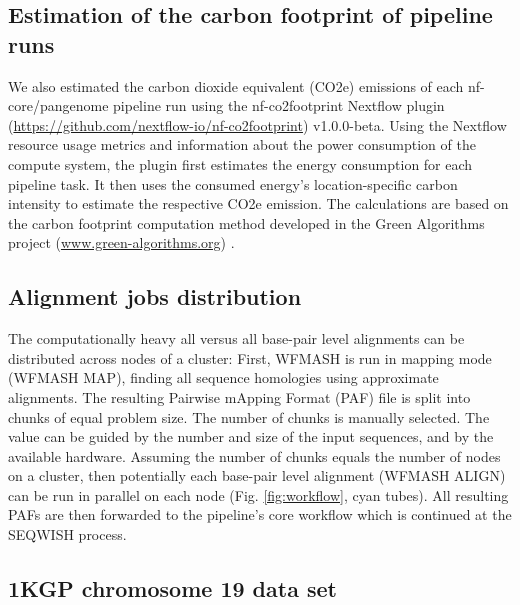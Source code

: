 \documentclass{bioinfo}
\theoremstyle{definition}
\begin{document}
	\subsection{Estimation of the carbon footprint of pipeline runs}
	
	We also estimated the carbon dioxide equivalent (CO2e) emissions of each nf-core/pangenome pipeline run using the nf-co2footprint Nextflow plugin (\href{https://github.com/nextflow-io/nf-co2footprint}{https://github.com/nextflow-io/nf-co2footprint}) v1.0.0-beta. 
	Using the Nextflow resource usage metrics and information about the power consumption of the compute system, the plugin first estimates the energy consumption for each pipeline task. 
	It then uses the consumed energy's location-specific carbon intensity to estimate the respective CO2e emission.
	The calculations are based on the carbon footprint computation method developed in the Green Algorithms project (\href{www.green-algorithms.org}{www.green-algorithms.org}) \citep{Lannelongue2021}.
	
	\subsection{Alignment jobs distribution}
	\label{aln_jobs_dist}

	The computationally heavy all versus all base-pair level alignments can be distributed across nodes of a cluster: 
	First, WFMASH is run in mapping mode (WFMASH MAP), finding all sequence homologies using approximate alignments. 
	The resulting Pairwise mApping Format (PAF) file is split into chunks of equal problem size. 
	The number of chunks is manually selected. 
	The value can be guided by the number and size of the input sequences, and by the available hardware. 
	Assuming the number of chunks equals the number of nodes on a cluster, then potentially each base-pair level alignment (WFMASH ALIGN) can be run in parallel on each node  (Fig. \ref{fig:workflow}, cyan tubes). 
	All resulting PAFs are then forwarded to the pipeline’s core workflow which is continued at the SEQWISH process.
	
	
	
	\subsection{1KGP chromosome 19 data set}
	
\end{document}
